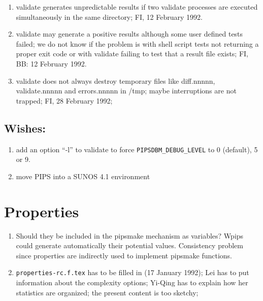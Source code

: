 \begin{enumerate}
  \item validate generates unpredictable results if two validate
        processes are executed simultaneously in the same directory;
        FI, 12 February 1992.

  \item validate may generate a positive results although some user
        defined tests failed; we do not know if the problem is with
        shell script tests not returning a proper exit code or
        with validate failing to test that a result file exists;
        FI, BB: 12 February 1992.

  \item validate does not always destroy temporary files like diff.nnnnn,
        validate.nnnnn
        and errors.nnnnn in /tmp; maybe interruptions are not trapped;
        FI, 28 February 1992;

\end{enumerate}

\subsection{Wishes:}

\begin{enumerate}

  \item add an option ``-l'' to validate to force \verb+PIPSDBM_DEBUG_LEVEL+ to
        0 (default), 5 or 9.

  \item move PIPS into a SUNOS 4.1 environment

\end{enumerate}

\section{Properties}

\begin{enumerate}

  \item Should they be included in the pipsmake mechanism as variables?
        Wpips could generate automatically their potential values.
        Consistency problem since properties are indirectly used to implement
        pipsmake functions.

  \item \verb+properties-rc.f.tex+ has to be filled in (17 January 1992);
        Lei has to put information about the complexity options; Yi-Qing
        has to explain how her statistics are organized; the present
        content is too sketchy;

\end{enumerate}

